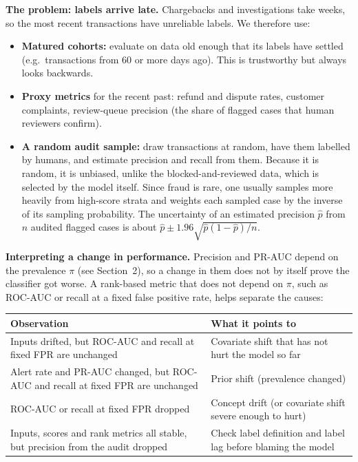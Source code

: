\documentclass[11pt]{article}
\begin{document}
\textbf{The problem: labels arrive late.} Chargebacks and investigations take weeks, so the most recent transactions have unreliable labels. We therefore use:
\begin{itemize}
    \item \textbf{Matured cohorts:} evaluate on data old enough that its labels have settled (e.g.\ transactions from 60 or more days ago). This is trustworthy but always looks backwards.
    \item \textbf{Proxy metrics} for the recent past: refund and dispute rates, customer complaints, review-queue precision (the share of flagged cases that human reviewers confirm).
    \item \textbf{A random audit sample:} draw transactions at random, have them labelled by humans, and estimate precision and recall from them. Because it is random, it is unbiased, unlike the blocked-and-reviewed data, which is selected by the model itself. Since fraud is rare, one usually samples more heavily from high-score strata and weights each sampled case by the inverse of its sampling probability. The uncertainty of an estimated precision \(\hat p\) from \(n\) audited flagged cases is about \(\hat p\pm1.96\sqrt{\hat p(1-\hat p)/n}\).
\end{itemize}

\textbf{Interpreting a change in performance.} Precision and PR-AUC depend on the prevalence \(\pi\) (see Section~2), so a change in them does not by itself prove the classifier got worse. A rank-based metric that does not depend on \(\pi\), such as ROC-AUC or recall at a fixed false positive rate, helps separate the causes:

\begin{center}
\begin{tabular}{|p{6.6cm}|p{7.6cm}|}
\hline
\textbf{Observation} & \textbf{What it points to} \\
\hline
Inputs drifted, but ROC-AUC and recall at fixed FPR are unchanged & Covariate shift that has not hurt the model so far \\
\hline
Alert rate and PR-AUC changed, but ROC-AUC and recall at fixed FPR are unchanged & Prior shift (prevalence changed) \\
\hline
ROC-AUC or recall at fixed FPR dropped & Concept drift (or covariate shift severe enough to hurt) \\
\hline
Inputs, scores and rank metrics all stable, but precision from the audit dropped & Check label definition and label lag before blaming the model \\
\hline
\end{tabular}
\end{center}
\end{document}
